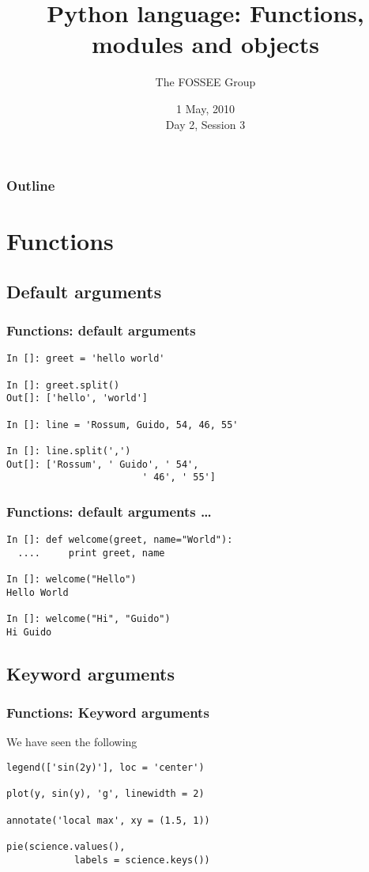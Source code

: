 \documentclass[14pt,compress]{beamer}
\title[Basic Python]{Python language: Functions, modules and objects}
\author[FOSSEE Team] {The FOSSEE Group}
\institute[IIT Bombay] {Department of Aerospace Engineering\\IIT Bombay}
\date[] {1 May, 2010\\Day 2, Session 3}
\begin{document}
\begin{frame}
  \titlepage
\end{frame}

\begin{frame}
  \frametitle{Outline}
  \tableofcontents
\end{frame}

\section{Functions}
\subsection{Default arguments}
\begin{frame}[fragile]
  \frametitle{Functions: default arguments}
  \begin{lstlisting}
In []: greet = 'hello world'

In []: greet.split()
Out[]: ['hello', 'world']

In []: line = 'Rossum, Guido, 54, 46, 55'

In []: line.split(',')
Out[]: ['Rossum', ' Guido', ' 54',
                        ' 46', ' 55']
  \end{lstlisting}
\end{frame}

\begin{frame}[fragile]
  \frametitle{Functions: default arguments \ldots}
  \begin{lstlisting}
In []: def welcome(greet, name="World"):
  ....     print greet, name

In []: welcome("Hello")
Hello World

In []: welcome("Hi", "Guido")
Hi Guido
  \end{lstlisting}
\end{frame} 

\subsection{Keyword arguments}
\begin{frame}[fragile]
  \frametitle{Functions: Keyword arguments}
We have seen the following
\begin{lstlisting}
legend(['sin(2y)'], loc = 'center')

plot(y, sin(y), 'g', linewidth = 2)

annotate('local max', xy = (1.5, 1))

pie(science.values(), 
            labels = science.keys())
  \end{lstlisting}
\end{frame}
\end{document}
